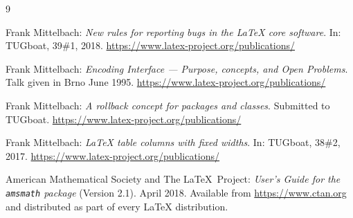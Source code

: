 \documentclass{ltnews}
\providecommand\pkg[1]{\texttt{#1}}
\begin{document}
\begin{thebibliography}{9}

 Frank Mittelbach:
  \emph{New rules for reporting bugs in the \LaTeX{} core software}.
  In: TUGboat, 39\#1, 2018.
  \url{https://www.latex-project.org/publications/}

 Frank Mittelbach:
  \emph{\LaTeXe{} Encoding Interface --- Purpose, concepts, and
   Open Problems}.
  Talk given in Brno June 1995.
  \url{https://www.latex-project.org/publications/}

 Frank Mittelbach:
  \emph{A rollback concept for packages and classes}.
  Submitted to TUGboat.
  \url{https://www.latex-project.org/publications/}

 Frank Mittelbach:
  \emph{\LaTeX{} table columns with fixed widths}.
  In: TUGboat, 38\#2, 2017.
  \url{https://www.latex-project.org/publications/}

 American Mathematical Society and The \LaTeX\ Project:
  \emph{User's Guide for the \pkg{amsmath} package} (Version 2.1).
  April 2018.
  Available from
  \url{https://www.ctan.org}
  and distributed as part of every \LaTeX{} distribution.

\end{thebibliography}
\end{document}
